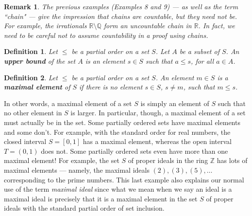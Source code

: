 \documentclass[12pt,reqno]{amsart}
\theoremstyle{plain}
\newtheorem{defi}{Definition}
\newtheorem{rem}{Remark}
\newcommand{\rr}{\mathbb R}
\newcommand{\zz}{\mathbb Z}
\newcommand{\qq}{\mathbb Q}
\begin{document}
\begin{rem} The previous examples (Examples 8 and 9) — as well as the term ``chain"  — give the impression that chains are countable, but they need not be. For example, the irrationals $\rr \setminus \qq$ form an uncountable chain in $\rr$. In fact, we need to be careful not to assume countability in a proof using chains. 
\end{rem}
\begin{defi} Let $\leq$ be a partial order on a set $S$. Let $A$ be a subset of $S$. An \textbf{upper bound} of the set $A$ is an element $s \in S$ such that $a \leq s$, for all $a \in A$.
\end{defi}
\begin{defi} Let $\leq$ be a partial order on a set $S$. An element $m \in S$ is a \textbf{maximal element} of $S$ if there is no element $s \in S$, $s \neq m$, such that $m \leq s$. 
\end{defi} 

In other words, a maximal element of a set $S$ is simply an element of $S$ such that no other element in $S$ is larger. In particular, though, a maximal element of a set must actually be in the set. Some partially ordered sets have maximal elements and some don't. For example, with the standard order for real numbers, the closed interval $S = [0, 1]$ has a maximal element, whereas the open interval $T = (0, 1)$ does not. Some partially ordered sets even have more than one maximal element! For example, the set $S$ of proper ideals in the ring $\zz$ has lots of maximal elements — namely, the maximal ideals $(2), (3), (5), \ldots$ corresponding to the prime numbers. This last example also explains our normal use of the term \textit{maximal ideal} since what we mean when we say an ideal is a maximal ideal is precisely that it is a maximal element in the set $S$ of proper ideals with the standard partial order of set inclusion. 
\end{document}
